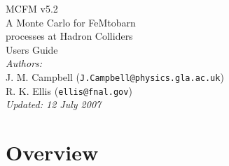 \documentclass[12pt]{article}
\begin{document}
\def\GeV{\mbox{GeV}}
\def\cteqsix{\mbox{hep-ph/0201195}}
\def\cteqfive{\mbox{hep-ph/9903282}}
\def\cteqfour{\mbox{hep-ph/9606399}}
\def\cteqthree{\mbox{MSU-HEP/41024}}
\def\mrstff{\mbox{hep-ph/0603143}}
\def\mrstohtwo{\mbox{hep-ph/0211080}}
\def\mrstohone{\mbox{hep-ph/0110215}}
\def\mrsninenine{\mbox{hep-ph/9907231}}
\def\mrsnineeight{\mbox{hep-ph/9803445}}
\def\mrsninesix{\mbox{PLB387 (1996) 419}}
\def\mrsninefive{\mbox{PLB354 (1995) 155}}
\def\hmrs{\mbox{Durham DTP-90-04}}

\thispagestyle{empty}
\vspace*{3cm}
\begin{center}
{\Huge MCFM v5.2} \\
\vspace*{0.5cm}
\Large{A Monte Carlo for FeMtobarn} \\
\Large{processes at Hadron Colliders} \\
\vspace*{2cm}
{\huge Users Guide} \\
\vspace*{4cm}
{\it Authors:} \\
\vspace*{0.2cm}
J. M. Campbell ({\tt J.Campbell@physics.gla.ac.uk}) \\
R. K. Ellis ({\tt ellis@fnal.gov}) \\
\vspace*{2.5cm}
{\it \small Updated: 12 July 2007}
\end{center}

\newpage

\tableofcontents

\section{Overview}
\end{document}
